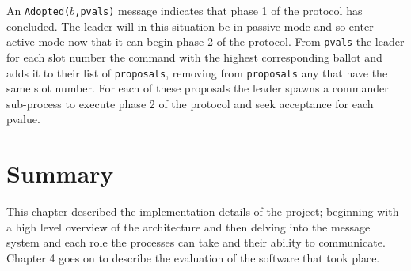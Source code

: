 An \texttt{Adopted($b$,pvals)} message indicates that phase 1 of the protocol has concluded. The leader will in this situation be in passive mode and so enter active mode now that it can begin phase 2 of the protocol. From \texttt{pvals} the leader for each slot number the command with the highest corresponding ballot and adds it to their list of \texttt{proposals}, removing from \texttt{proposals} any that have the same slot number. For each of these proposals the leader spawns a commander sub-process to execute phase 2 of the protocol and seek acceptance for each pvalue.

\section{Summary}

This chapter described the implementation details of the project; beginning with a high level overview of the architecture and then delving into the message system and each role the processes can take and their ability to communicate. Chapter 4 goes on to describe the evaluation of the software that took place.



















